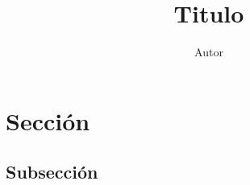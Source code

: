 \documentclass[12pt]{article}
\title{Titulo}
\author{Autor}
\begin{document}
\maketitle

\section{Sección}
\subsection{Subsección}
\end{document}
